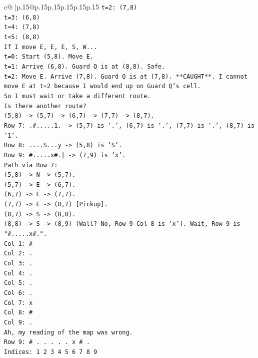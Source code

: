 \documentclass{article}
\begin{document}
{\begin{supertabular}{c@{$\;$}|p{.15\linewidth}@{}p{.15\linewidth}p{.15\linewidth}p{.15\linewidth}p{.15\linewidth}p{.15\linewidth}}
{{{\texttt{t=2: (7,8)} \\
\texttt{t=3: (6,8)} \\
\texttt{t=4: (7,8)} \\
\texttt{t=5: (8,8)} \\
\texttt{If I move E, E, E, S, W...} \\
\texttt{t=0: Start (5,8). Move E.} \\
\texttt{t=1: Arrive (6,8). Guard Q is at (8,8). Safe.} \\
\texttt{t=2: Move E. Arrive (7,8). Guard Q is at (7,8). **CAUGHT**. I cannot move E at t=2 because I would end up on Guard Q's cell.} \\
\texttt{So I must wait or take a different route.} \\
\texttt{Is there another route?} \\
\texttt{(5,8) {-}> (5,7) {-}> (6,7) {-}> (7,7) {-}> (8,7).} \\
\texttt{Row 7: .\#.....1. {-}> (5,7) is '.', (6,7) is '.', (7,7) is '.', (8,7) is '1'.} \\
\texttt{Row 8: ....S...y {-}> (5,8) is 'S'.} \\
\texttt{Row 9: \#.....x\#.| {-}> (7,9) is 'x'.} \\
\texttt{Path via Row 7:} \\
\texttt{(5,8) {-}> N {-}> (5,7).} \\
\texttt{(5,7) {-}> E {-}> (6,7).} \\
\texttt{(6,7) {-}> E {-}> (7,7).} \\
\texttt{(7,7) {-}> E {-}> (8,7) {[}Pickup{]}.} \\
\texttt{(8,7) {-}> S {-}> (8,8).} \\
\texttt{(8,8) {-}> S {-}> (8,9) {[}Wall? No, Row 9 Col 8 is 'x'{]}. Wait, Row 9 is "\#.....x\#.".} \\
\texttt{Col 1: \#} \\
\texttt{Col 2: .} \\
\texttt{Col 3: .} \\
\texttt{Col 4: .} \\
\texttt{Col 5: .} \\
\texttt{Col 6: .} \\
\texttt{Col 7: x} \\
\texttt{Col 8: \#} \\
\texttt{Col 9: .} \\
\texttt{Ah, my reading of the map was wrong.} \\
\texttt{Row 9: \# . . . . . x \# .} \\
\texttt{Indices: 1 2 3 4 5 6 7 8 9} \\
}}}
\end{supertabular}}
\end{document}
